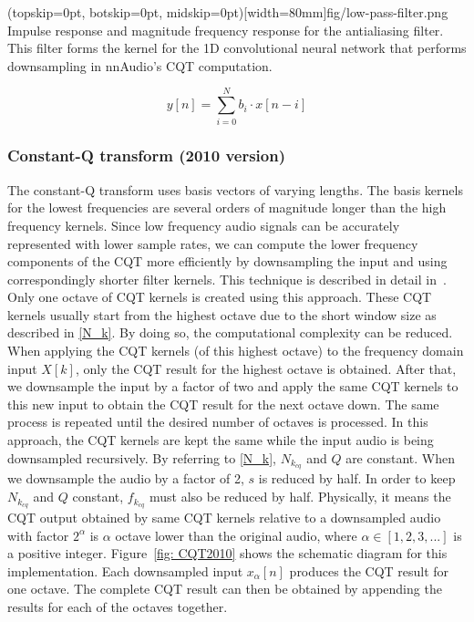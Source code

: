 \documentclass{ieeeaccess}
\begin{document}
\Figure(topskip=0pt, botskip=0pt, midskip=0pt)[width=80mm]{fig/low-pass-filter.png}
{Impulse response and magnitude frequency response for the antialiasing filter. This filter forms the kernel for the 1D convolutional neural network that performs downsampling in nnAudio's CQT computation. \label{fig:low-pass-filter}}

\begin{equation}
    y[n] = \sum_{i=0}^{N}b_i\cdot x[n-i]
    \label{FIR}
\end{equation}


\subsubsection{Constant-Q transform (2010 version)}

The constant-Q transform uses basis vectors of varying lengths. The basis kernels for the lowest frequencies are several orders of magnitude longer than the high frequency kernels. Since low frequency audio signals can be accurately represented with lower sample rates, we can compute the lower frequency components of the CQT more efficiently by downsampling the input and using correspondingly shorter filter kernels. This technique is described in detail in~\cite{schorkhuber2010constant, brown1991calculation}. Only one octave of CQT kernels is created using this approach. These CQT kernels usually start from the highest octave due to the short window size as described in \eqref{N_k}. By doing so, the computational complexity can be reduced. When applying the CQT kernels (of this highest octave) to the frequency domain input $X[k]$, only the CQT result for the highest octave is obtained. After that, we downsample the input by a factor of two and apply the same CQT kernels to this new input to obtain the CQT result for the next octave down. The same process is repeated until the desired number of octaves is processed. In this approach, the CQT kernels are kept the same while the input audio is being downsampled recursively. By referring to \eqref{N_k}, $N_{k_{cq}}$ and $Q$ are constant. When we downsample the audio by a factor of 2, $s$ is reduced by half. In order to keep $N_{k_{cq}}$ and $Q$ constant, $f_{k_{cq}}$ must also be reduced by half. Physically, it means the CQT output obtained by same CQT kernels relative to a downsampled audio with factor $2^\alpha$ is $\alpha$ octave lower than the original audio, where $\alpha \in [1,2,3,...]$ is a positive integer. Figure~\ref{fig: CQT2010} shows the schematic diagram for this implementation. Each downsampled input $x_\alpha[n]$ produces the CQT result for one octave. The complete CQT result can then be obtained by appending the results for each of the octaves together.
\end{document}
